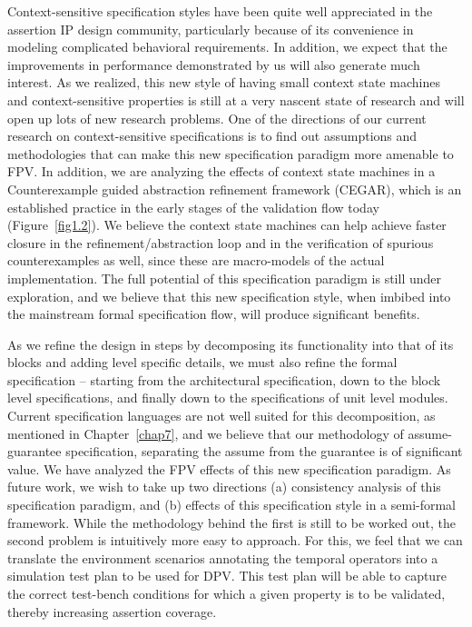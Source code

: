 \noindent
Context-sensitive specification styles have been quite well appreciated 
in the assertion IP design community, particularly because of its 
convenience in modeling complicated behavioral requirements. In 
addition, we expect that the improvements in performance demonstrated by us 
will also generate much interest. As we realized, this new style of having 
small context state machines and context-sensitive properties is still at 
a very nascent state of research and will open up lots of new research 
problems. One of the directions of our current research on 
context-sensitive specifications is to find out assumptions 
and methodologies that 
can make this new specification paradigm more amenable to FPV. In addition, we 
are analyzing the effects of context state machines in a Counterexample 
guided abstraction refinement framework (CEGAR), which is an 
established practice in the early stages of the validation flow today
(Figure~\ref{fig1.2}). We believe the context state machines can help 
achieve faster closure in the refinement/abstraction loop and in the 
verification of spurious counterexamples as well, since these are macro-models 
of the actual implementation. The full potential of this specification 
paradigm is still under exploration, and we believe that this new 
specification style, when imbibed into the mainstream formal specification 
flow, will produce significant benefits. 

\noindent
As we refine the design in steps by decomposing
its functionality into that of its blocks and adding level specific
details, we must also refine the formal specification -- starting from the
architectural specification, down to the block level specifications,
and finally down to the specifications of unit level modules. Current 
specification languages are not well suited for this decomposition, as 
mentioned in Chapter~\ref{chap7}, and we believe that our methodology 
of assume-guarantee specification, separating the assume from the 
guarantee is of significant value. We have analyzed the FPV effects of 
this new specification paradigm. As future work, we wish to take up 
two directions (a) consistency analysis of this specification paradigm, 
and (b) effects of this specification style in a semi-formal framework. 
While the methodology behind the first is still to be worked out, the 
second problem is intuitively more easy to approach. For this, we feel that 
we can translate the environment scenarios annotating the temporal operators 
into a simulation test plan to be used for DPV. This test plan will be able to 
capture the correct test-bench conditions for which a given property is to 
be validated, thereby increasing assertion coverage.

